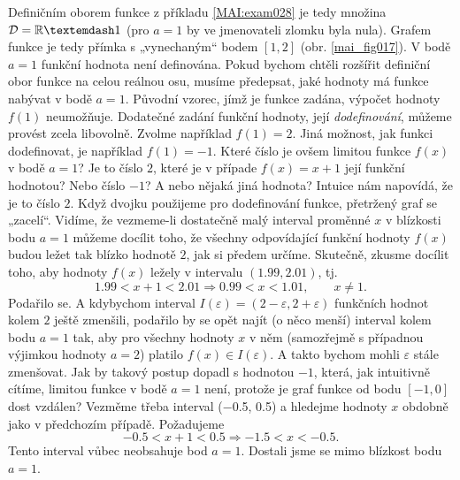 {    Definičním oborem funkce z příkladu \ref{MAI:exam028} je tedy množina \(\mathcal{D} = \realset 
    — {1}\) (pro \(a = 1\) by ve jmenovateli zlomku byla nula). Grafem funkce je tedy přímka s 
    „vynechaným“ bodem \([1, 2]\) (obr. \ref{mai_fig017}). V bodě \(a = 1\) funkční hodnota není 
    definována. Pokud bychom chtěli rozšířit definiční obor funkce na celou reálnou osu, musíme 
    předepsat, jaké hodnoty má funkce nabývat v bodě \(a = 1\). Původní vzorec, jímž je funkce 
    zadána, výpočet hodnoty \(f(1)\) neumožňuje. Dodatečné zadání funkční hodnoty, její 
    \emph{dodefinování}, můžeme provést zcela libovolně. Zvolme například \(f(1) = 2\). Jiná 
    možnost, jak funkci dodefinovat, je například \(f(1) =-1\). Které číslo je ovšem limitou funkce 
    \(f(x)\) v bodě \(a = 1\)? Je to číslo \(2\), které je v případe \(f(x) = x+1\) její funkční 
    hodnotou? Nebo číslo \(-1\)? A nebo nějaká jiná hodnota? Intuice nám napovídá, že je to číslo 
    \(2\). Když dvojku použijeme pro dodefinování funkce, přetržený graf se „zacelí“. Vidíme, že 
    vezmeme-li dostatečně malý interval proměnné \(x\) v blízkosti bodu \(a=1\) můžeme docílit 
    toho, že všechny odpovídající funkční hodnoty \(f(x)\) budou ležet tak blízko hodnotě \(2\), 
    jak si předem určíme. Skutečně, zkusme docílit toho, aby hodnoty \(f(x)\) ležely v intervalu 
    \((\num{1.99}, \num{2.01})\), tj.
    \begin{equation*}
      \num{1.99} < x + 1 < \num{2.01} \Rightarrow \num{0.99} < x < \num{1.01},\qquad x\neq1.
    \end{equation*}
    Podařilo se. A kdybychom interval \(I(\varepsilon) = (2 - \varepsilon, 2 + \varepsilon)\) 
    funkčních hodnot kolem \(2\) ještě zmenšili, podařilo by se opět najít (o něco menší) interval 
    kolem bodu \(a = 1\) tak, aby pro všechny hodnoty \(x\) v něm (samozřejmě s případnou výjimkou 
    hodnoty \(a =2\)) platilo \(f(x)\in I(\varepsilon)\). A takto bychom mohli \(\varepsilon\) 
    stále zmenšovat. Jak by takový postup dopadl s hodnotou \(-1\), která, jak intuitivně cítíme, 
    limitou funkce v bodě \(a = 1\) není, protože je graf funkce od bodu \([-1,0]\) dost vzdálen? 
    Vezměme třeba interval (\num{-0.5}, \num{0.5}) a hledejme hodnoty \(x\) obdobně jako v 
    předchozím případě. Požadujeme
    \begin{equation*}
      \num{-0.5} < x + 1 < \num{0.5} \Rightarrow \num{-1.5} < x < \num{-0.5}.
    \end{equation*}
    Tento interval vůbec neobsahuje bod \(a = 1\). Dostali jsme se mimo blízkost bodu \(a = 1\).

}
